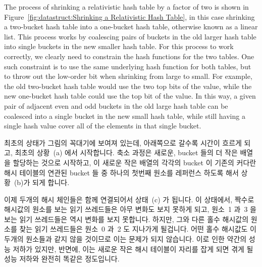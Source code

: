 The process of shrinking a relativistic hash table by a factor of two
is shown in
Figure~\ref{fig:datastruct:Shrinking a Relativistic Hash Table},
in this case shrinking a two-bucket hash table into a one-bucket
hash table, otherwise known as a linear list.
This process works by coalescing pairs of buckets in the old larger hash
table into single buckets in the new smaller hash table.
For this process to work correctly, we clearly need to constrain the hash
functions for the two tables.
One such constraint is to use the same underlying hash function for
both tables, but to throw out the low-order bit when shrinking from
large to small.
For example, the old two-bucket hash table would
use the two top bits of the value, while the new one-bucket hash table
could use the top bit of the value.
In this way, a given pair of adjacent even and odd buckets in the old
large hash table can be coalesced into a single bucket in the new small
hash table, while still having a single hash value cover all of the
elements in that single bucket.
\fi

최초의 상태가 그림의 꼭대기에 보여져 있는데, 아래쪽으로 갈수록 시간이 흐르게
되고, 최초의 상황~(a) 에서 시작합니다.
축소 과정은 새로운, bucket 들의 더 작은 배열을 할당하는 것으로 시작하고, 이
새로운 작은 배열의 각각의 bucket 이 기존의 커다란 해시 테이블의 연관된 bucket
들 중 하나의 첫번째 원소를 레퍼런스 하도록 해서 상황~(b)가 되게 합니다.

이제 두개의 해시 체인들은 함께 연결되어서 상태~(c) 가 됩니다.
이 상태에서, 짝수로 해시값의 원소를 보는 읽기 쓰레드들은 아무 변화도 보지
못하게 되고, 원소~1 과~3 을 보는 읽기 쓰레드들은 역시 변화를 보지 못합니다.
하지만, 그와 다른 홀수 해시값의 원소를 찾는 읽기 쓰레드들은 원소~0 과~2 도
지나가게 될겁니다.
어떤 홀수 해시값도 이 두개의 원소들과 같지 않을 것이므로 이는 문제가 되지
않습니다.
이로 인한 약간의 성능 저하가 있지만, 반면에, 이는 새로운 작은 해시 테이블이
자리를 잡게 되면 겪게 될 성능 저하와 완전히 똑같은 정도입니다.

